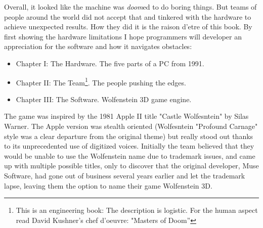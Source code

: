 Overall, it looked like the machine was \emph{doom}ed to do boring things. But teams of people around the world did not accept that and tinkered with the hardware to achieve unexpected results. How they did it is the raison d'etre of this book. By first showing the hardware limitations I hope programmers will developer an appreciation for the software and how it navigates obstacles:
\begin{itemize}
\item Chapter I: The Hardware. The five parts of a PC from 1991.
\item Chapter II: The Team\footnote{This is an engineering book: The description is logistic. For the human aspect read David Kushner's chef d'oeuvre: "Masters of Doom''}. The people pushing the edges.
\item Chapter III: The Software. Wolfenstein 3D game engine.
\end{itemize}
\par
{} The game was inspired by the 1981 Apple II title "Castle Wolfesntein" by Silas Warner. The Apple version was stealth oriented (Wolfesntein "Profound Carnage" style was a clear departure from the original theme) but really stood out thanks to its unprecedented use of digitized voices. Initially the team believed that they would be unable to use the Wolfenstein name due to trademark issues, and came up with multiple possible titles, only to discover that the original developer, Muse Software, had gone out of business several years earlier and let the trademark lapse, leaving them the option to name their game Wolfenstein 3D.

\begin{figure}[H]
\centering
{}
\end{figure}
